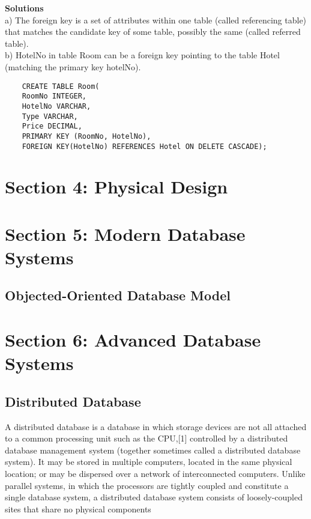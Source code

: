 \documentclass[]{article}
\begin{document}
\textbf{Solutions}\\
a) The foreign key is a set of attributes within one table (called referencing table) that matches the candidate key of some table, possibly the same (called referred table).\\
b) HotelNo in table Room can be a foreign key pointing to the table Hotel (matching the primary key hotelNo).\\

\begin{framed}
\begin{verbatim}	
	CREATE TABLE Room(
	RoomNo INTEGER,
	HotelNo VARCHAR, 
	Type VARCHAR,
	Price DECIMAL,
	PRIMARY KEY (RoomNo, HotelNo),
	FOREIGN KEY(HotelNo) REFERENCES Hotel ON DELETE CASCADE);
\end{verbatim}
\end{framed}
\newpage 
\section{Section 4: Physical Design}

\newpage 
\section{Section 5: Modern Database Systems}

\subsection{ Objected-Oriented Database Model}
\newpage 

\section{Section 6: Advanced Database Systems}
\subsection{Distributed Database}
A distributed database is a database in which storage devices are not all attached to a common processing unit such as the CPU,[1] controlled by a distributed database management system (together sometimes called a distributed database system). It may be stored in multiple computers, located in the same physical location; or may be dispersed over a network of interconnected computers. Unlike parallel systems, in which the processors are tightly coupled and constitute a single database system, a distributed database system consists of loosely-coupled sites that share no physical components
\end{document}
